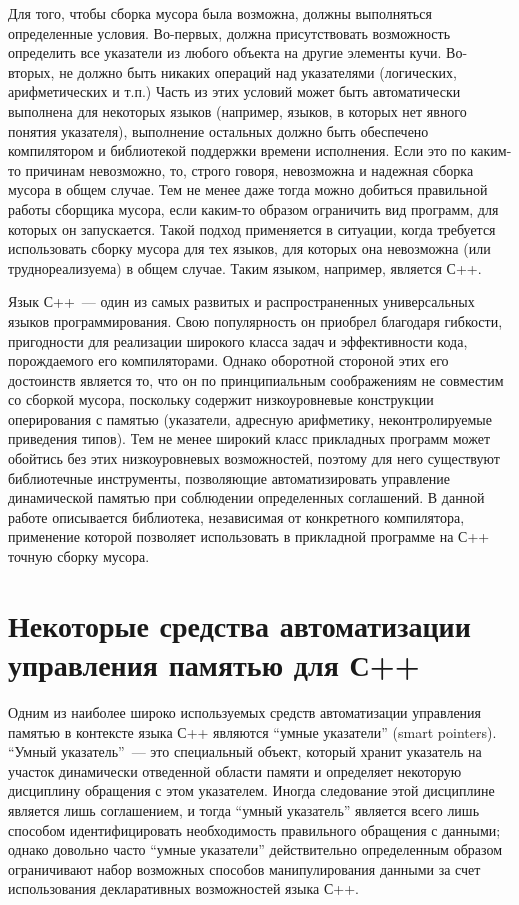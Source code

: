 Для того, чтобы сборка мусора была возможна, должны выполняться определенные условия. Во-первых, должна присутствовать 
возможность определить все указатели из любого объекта на другие элементы кучи. Во-вторых, не должно быть никаких 
операций над указателями (логических, арифметических и т.п.) Часть из этих условий может быть автоматически выполнена
для некоторых языков (например, языков, в которых нет явного понятия указателя), выполнение остальных должно быть
обеспечено компилятором и библиотекой поддержки времени исполнения. Если это по каким-то причинам невозможно, то, строго
говоря, невозможна и надежная сборка мусора в общем случае. Тем не менее даже тогда можно добиться правильной
работы сборщика мусора, если каким-то образом ограничить вид программ, для которых он запускается. Такой подход применяется 
в ситуации, когда требуется использовать сборку мусора для тех языков, для которых она невозможна (или труднореализуема) 
в общем случае. Таким языком, например, является С++.

Язык С++~--- один из самых развитых и распространенных универсальных языков программирования. Свою популярность он приобрел 
благодаря гибкости, пригодности для реализации широкого класса задач и эффективности кода, порождаемого его 
компиляторами. Однако оборотной стороной этих его достоинств является то, что он по принципиальным соображениям не 
совместим со сборкой мусора, поскольку содержит низкоуровневые конструкции оперирования с памятью (указатели, адресную 
арифметику, неконтролируемые приведения типов). Тем не менее широкий класс прикладных программ может обойтись без этих
низкоуровневых возможностей, поэтому для него существуют библиотечные инструменты, позволяющие автоматизировать
управление динамической памятью при соблюдении определенных соглашений. В данной работе описывается
библиотека, независимая от конкретного компилятора, применение которой позволяет использовать в прикладной
программе на С++ точную сборку мусора.
\section{Некоторые средства автоматизации\\
управления памятью для С++}

Одним из наиболее широко используемых средств автоматизации управления памятью в
контексте языка С++ являются ``умные указатели'' (smart pointers). ``Умный указатель''~---
это специальный объект, который хранит указатель на участок динамически отведенной области
памяти и определяет некоторую дисциплину обращения с этом указателем. Иногда следование
этой дисциплине является лишь соглашением, и тогда ``умный указатель'' является всего лишь
способом идентифицировать необходимость правильного обращения с данными; однако довольно часто
``умные указатели'' действительно определенным образом ограничивают набор возможных
способов манипулирования данными за счет использования декларативных возможностей языка С++.

